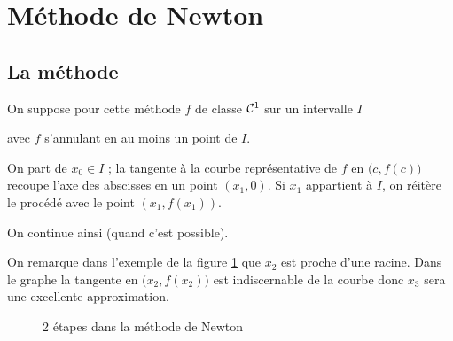 \newpage
\section{Méthode de Newton}
\subsection{La méthode}
On suppose pour cette méthode $f$ de classe ${\cal C}^1$ sur un intervalle $I$ 

avec $f$ s'annulant en au moins un point de $I$. 

On part de $x_0\in I$ ; la tangente à la courbe représentative de $f$ en $\bigl(c,f(c)\bigr)$ recoupe l'axe des abscisses en un point $(x_1,0)$. 
Si $x_1$ appartient à $I$, on réitère le procédé avec le point $(x_1,f(x_1))$. 

On continue ainsi (quand c'est possible).

On remarque dans l'exemple de la figure \ref{grf:newton} que $x_2$ est proche d'une racine. Dans le graphe la tangente en $\bigl(x_2, f(x_2)\bigr)$ est indiscernable de la courbe donc $x_3$ sera une excellente approximation.
\begin{figure}[ht]
  \begin{center}
  \caption{\label{grf:newton} 2 étapes dans la méthode de Newton}
  \end{center}
\end{figure}
\medskip

